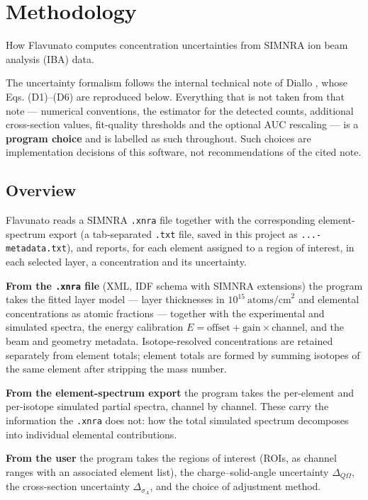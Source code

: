 \section{Methodology}\label{methodology}

How Flavunato computes concentration uncertainties from SIMNRA ion beam
analysis (IBA) data.

The uncertainty formalism follows the internal technical note of Diallo
\citep{diallo2025iba}, whose Eqs. (D1)--(D6) are reproduced below.
Everything that is not taken from that note --- numerical conventions,
the estimator for the detected counts, additional cross-section values,
fit-quality thresholds and the optional AUC rescaling --- is a
\textbf{program choice} and is labelled as such throughout. Such choices
are implementation decisions of this software, not recommendations of
the cited note.

\subsection{Overview}\label{overview}

Flavunato reads a SIMNRA \texttt{.xnra} file together with the
corresponding element-spectrum export (a tab-separated \texttt{.txt}
file, saved in this project as \texttt{...-metadata.txt}), and reports,
for each element assigned to a region of interest, in each selected
layer, a concentration and its uncertainty.

\textbf{From the \texttt{.xnra} file} (XML, IDF schema with SIMNRA
extensions) the program takes the fitted layer model --- layer
thicknesses in \(10^{15}\ \text{atoms/cm}^2\) and elemental
concentrations as atomic fractions --- together with the experimental
and simulated spectra, the energy calibration
\(E = \text{offset} + \text{gain}\times\text{channel}\), and the beam
and geometry metadata. Isotope-resolved concentrations are retained
separately from element totals; element totals are formed by summing
isotopes of the same element after stripping the mass number.

\textbf{From the element-spectrum export} the program takes the
per-element and per-isotope simulated partial spectra, channel by
channel. These carry the information the \texttt{.xnra} does not: how
the total simulated spectrum decomposes into individual elemental
contributions.

\textbf{From the user} the program takes the regions of interest (ROIs,
as channel ranges with an associated element list), the
charge--solid-angle uncertainty \(\Delta_{Q\Omega}\), the cross-section
uncertainty \(\Delta_{\sigma_A}\), and the choice of adjustment method.


